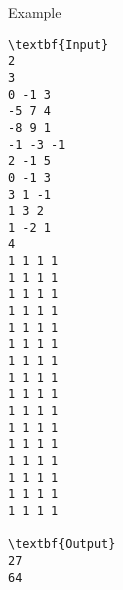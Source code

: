 Example
\begin{verbatim}
\textbf{Input}
2
3
0 -1 3
-5 7 4
-8 9 1
-1 -3 -1
2 -1 5
0 -1 3
3 1 -1
1 3 2
1 -2 1
4
1 1 1 1
1 1 1 1
1 1 1 1
1 1 1 1
1 1 1 1
1 1 1 1
1 1 1 1
1 1 1 1
1 1 1 1
1 1 1 1
1 1 1 1
1 1 1 1
1 1 1 1
1 1 1 1
1 1 1 1
1 1 1 1

\textbf{Output}
27
64
\end{verbatim}
